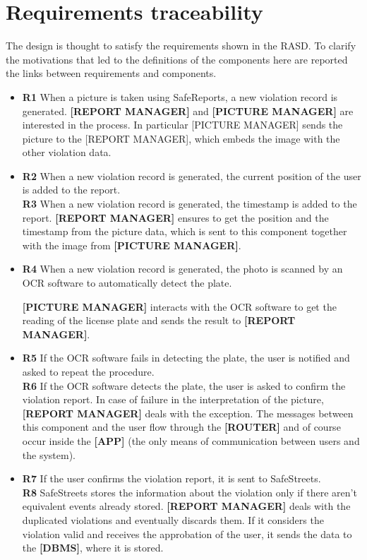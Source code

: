\documentclass[a4paper]{article}
\begin{document}
\newpage
\section{Requirements traceability}
The design is thought to satisfy the requirements shown in the RASD. To clarify the motivations that led to the definitions of the components here are reported the links between requirements and components.


\begin{itemize}
\item
  \textbf{R1} When a picture is taken using SafeReports, a new violation
  record is generated.
    \subitem 
    \textbf{[REPORT MANAGER]} and \textbf{[PICTURE MANAGER]} are interested in the process. In particular [PICTURE MANAGER] sends the picture to the [REPORT MANAGER], which embeds the image with the other violation data.
  	
\item
  \textbf{R2} When a new violation record is generated, the current
  position of the user is added to the report.\\
  \textbf{R3} When a new violation record is generated, the timestamp is
  added to the report.
  \subitem
    \textbf{[REPORT MANAGER]} ensures to get the position and the timestamp from the picture data, which is sent to this component together with the image from \textbf{[PICTURE MANAGER]}.
  
\item
  \textbf{R4} When a new violation record is generated, the photo is
  scanned by an OCR software to automatically detect the plate.
    
   \subitem
      \textbf{[PICTURE MANAGER]} interacts with the OCR software to get the reading of the license plate and sends the result to \textbf{[REPORT MANAGER]}.
  
\item
  \textbf{R5} If the OCR software fails in detecting the plate, the user
  is notified and asked to repeat the procedure.\\
  \textbf{R6} If the OCR software detects the plate, the user is asked
  to confirm the violation report.
  \subitem
    In case of failure in the interpretation of the picture, \textbf{[REPORT MANAGER]} deals with the exception. The messages between this component and the user flow through the \textbf{[ROUTER]} and of course occur inside the \textbf{[APP]} (the only means of communication between users and the system).
  
\item
  \textbf{R7} If the user confirms the violation report, it is sent to
  SafeStreets.\\
  \textbf{R8} SafeStreets stores the information about the violation
  only if there aren't equivalent events already stored.
   \subitem
   \textbf{[REPORT MANAGER]} deals with the duplicated violations and eventually discards them. If it considers the violation valid and receives the approbation of the user, it sends the data to the \textbf{[DBMS]}, where it is stored.
  
\end{itemize}
\end{document}

